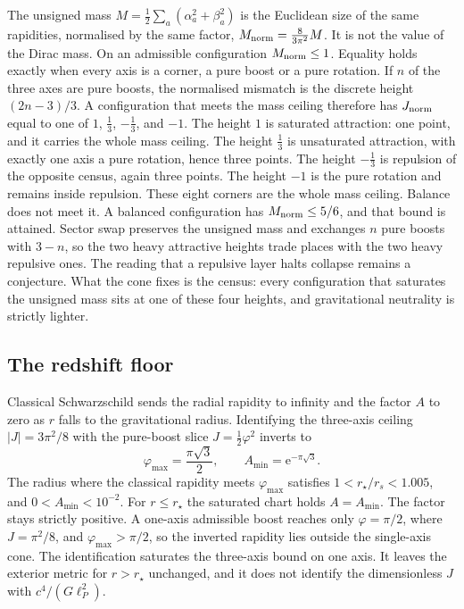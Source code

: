 \documentclass[a4paper]{article}
\begin{document}
The unsigned mass \(M=\frac12\sum_a(\alpha_a^2+\beta_a^2)\) is the Euclidean size of the same rapidities, normalised by the same factor, \(M_{\rm norm}=\frac8{3\pi^2}M\). It is not the value of the Dirac mass. On an admissible configuration \(M_{\rm norm}\le 1\). Equality holds exactly when every axis is a corner, a pure boost or a pure rotation. If \(n\) of the three axes are pure boosts, the normalised mismatch is the discrete height \((2n-3)/3\). A configuration that meets the mass ceiling therefore has \(J_{\rm norm}\) equal to one of \(1\), \(\frac13\), \(-\frac13\), and \(-1\). The height \(1\) is saturated attraction: one point, and it carries the whole mass ceiling. The height \(\frac13\) is unsaturated attraction, with exactly one axis a pure rotation, hence three points. The height \(-\frac13\) is repulsion of the opposite census, again three points. The height \(-1\) is the pure rotation and remains inside repulsion. These eight corners are the whole mass ceiling. Balance does not meet it. A balanced configuration has \(M_{\rm norm}\le 5/6\), and that bound is attained. Sector swap preserves the unsigned mass and exchanges \(n\) pure boosts with \(3-n\), so the two heavy attractive heights trade places with the two heavy repulsive ones. The reading that a repulsive layer halts collapse remains a conjecture. What the cone fixes is the census: every configuration that saturates the unsigned mass sits at one of these four heights, and gravitational neutrality is strictly lighter.

\subsection{The redshift floor}
\label{subsec:no-horizon}

Classical Schwarzschild sends the radial rapidity to infinity and the factor \(A\) to zero as \(r\) falls to the gravitational radius. Identifying the three-axis ceiling \(|J|=3\pi^2/8\) with the pure-boost slice \(J=\tfrac12\varphi^2\) inverts to
\[
\varphi_{\max}=\frac{\pi\sqrt{3}}{2},\qquad
A_{\min}=\mathrm{e}^{-\pi\sqrt{3}}.
\]
The radius where the classical rapidity meets \(\varphi_{\max}\) satisfies \(1<r_\star/r_s<1.005\), and \(0<A_{\min}<10^{-2}\). For \(r\le r_\star\) the saturated chart holds \(A=A_{\min}\). The factor stays strictly positive. A one-axis admissible boost reaches only \(\varphi=\pi/2\), where \(J=\pi^2/8\), and \(\varphi_{\max}>\pi/2\), so the inverted rapidity lies outside the single-axis cone. The identification saturates the three-axis bound on one axis. It leaves the exterior metric for \(r>r_\star\) unchanged, and it does not identify the dimensionless \(J\) with \(c^4/(G\ell_P^2)\).
\end{document}
